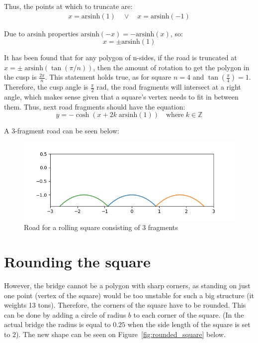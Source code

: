 \documentclass[12pt]{article}
\begin{document}
        Thus, the points at which to truncate are:
        \begin{align}\label{eq:x_cosh_end}
            x = \text{arsinh}(1) \quad\lor\quad x = \text{arsinh}(-1)
        \end{align}

        Due to arsinh properties $\text{arsinh}(-x) = - \text{arsinh}(x)$, so:
        \begin{equation}
            x = \pm \text{arsinh}(1)
        \end{equation} 

        It has been found that for any polygon of n-sides, if the road is truncated at $x = \pm \; \text{arsinh}(\tan(\pi / n))$, then the amount of rotation to get the polygon in the cusp is $\frac{2\pi}{n}$\cite{Hall_Wagon_1992}. This statement holds true, as for square $n=4$ and $\tan(\frac{\pi}{4}) = 1$. Therefore, the cusp angle is $\frac{\pi}{2}$ rad, the road fragments will intersect at a right angle, which makes sense given that a square's vertex needs to fit in between them. Thus, next road fragments should have the equation\cite{Hall_Wagon_1992}:
        \begin{equation}
            y = - \cosh (x + 2k \;\text{arsinh}(1) ) \quad \text{where}\; k \in \mathbb{Z}
        \end{equation}
        
        A 3-fragment road can be seen below:
        \begin{figure}[H]
            \centering
            \includegraphics[width=\linewidth]{images/road_3.png}
            \caption{Road for a rolling square consisting of 3 fragments}\label{fig:road3}
        \end{figure}

    \section{Rounding the square}

        However, the bridge cannot be a polygon with sharp corners, as standing on just one point (vertex of the square) would be too unstable for such a big structure (it weights 13 tons\cite{bridge_newatlas}). Therefore, the corners of the square have to be rounded. This can be done by adding a circle of radius $b$ to each corner of the square. (In the actual bridge the radius is equal to $0.25$ when the side length of the square is set to $2$). The new shape can be seen on Figure~\ref{fig:rounded_square} below.
\end{document}
